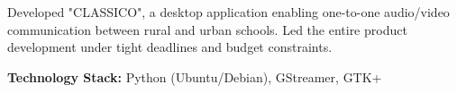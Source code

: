 Developed "CLASSICO", a desktop application enabling one-to-one audio/video communication between rural and urban schools. Led the entire product development under tight deadlines and budget constraints.

\textbf{Technology Stack:} Python (Ubuntu/Debian), GStreamer, GTK+